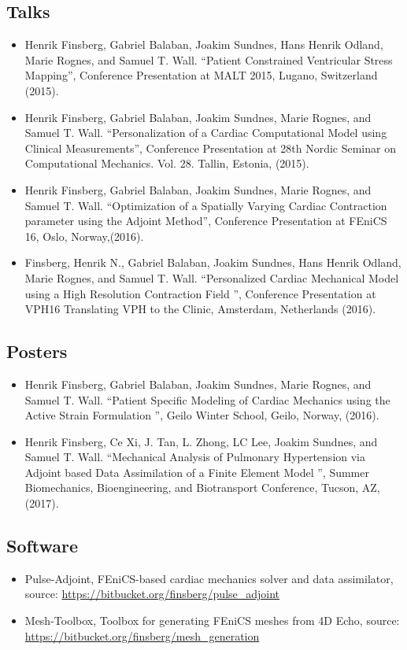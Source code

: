 \subsection{Talks}
\begin{itemize}
  \item Henrik Finsberg, Gabriel Balaban, Joakim Sundnes, Hans
    Henrik Odland, Marie Rognes, and Samuel T. Wall. ``Patient
    Constrained Ventricular Stress Mapping'',
    Conference Presentation at MALT 2015,  Lugano, Switzerland (2015).
  \item Henrik Finsberg, Gabriel Balaban, Joakim Sundnes, Marie
    Rognes, and Samuel T. Wall. ``Personalization of a Cardiac
    Computational Model using Clinical Measurements'', Conference
    Presentation at 28th Nordic Seminar on Computational
    Mechanics. Vol. 28. Tallin, Estonia, (2015).
  \item Henrik Finsberg, Gabriel Balaban, Joakim Sundnes, Marie
    Rognes, and Samuel T. Wall. ``Optimization of a Spatially Varying
    Cardiac Contraction parameter using the Adjoint Method'',
    Conference Presentation at FEniCS 16, Oslo, Norway,(2016).
  \item Finsberg, Henrik N., Gabriel Balaban, Joakim Sundnes, Hans
    Henrik Odland, Marie Rognes, and Samuel T. Wall. ``Personalized
    Cardiac Mechanical Model using a High Resolution Contraction Field
    '',  Conference Presentation at VPH16 Translating VPH to the
    Clinic,  Amsterdam, Netherlands (2016).
\end{itemize}


\subsection{Posters}
\begin{itemize}
  \item Henrik Finsberg, Gabriel Balaban, Joakim Sundnes, Marie
    Rognes, and Samuel T. Wall. ``Patient Specific Modeling of Cardiac
    Mechanics using the Active Strain Formulation '',
    Geilo Winter School, Geilo, Norway, (2016).
  \item Henrik Finsberg, Ce Xi, J. Tan, L. Zhong, LC Lee, Joakim
    Sundnes, and Samuel T. Wall. ``Mechanical Analysis of Pulmonary
    Hypertension via Adjoint based Data Assimilation of a Finite
    Element Model '', Summer Biomechanics, Bioengineering, and
    Biotransport Conference, Tucson, AZ, (2017). 
  \end{itemize}


\subsection{Software}
\begin{itemize}
  \item Pulse-Adjoint, FEniCS-based cardiac mechanics solver and data
    assimilator, source: \url{https://bitbucket.org/finsberg/pulse_adjoint}
  \item Mesh-Toolbox, Toolbox for generating FEniCS meshes from 4D
    Echo,  source: \url{https://bitbucket.org/finsberg/mesh_generation}
\end{itemize}


